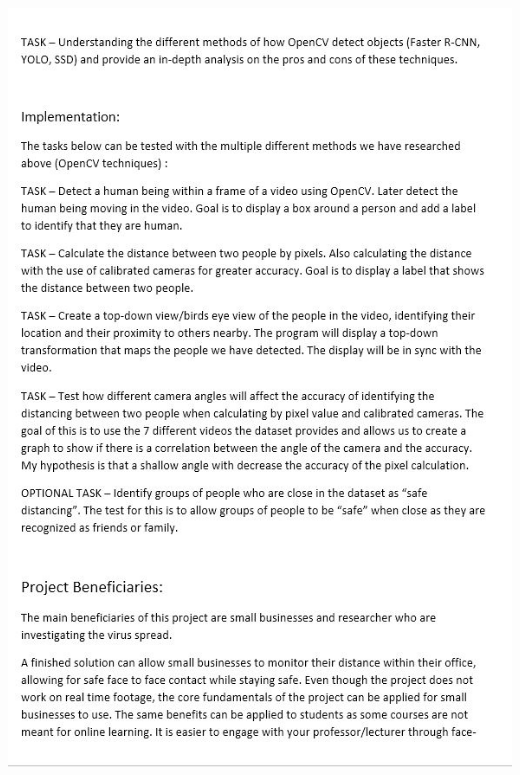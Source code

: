 \documentclass[12pt]{report}
\begin{document}
\includegraphics[width=160mm]{./images/appendix/PDD2.JPG}
\end{document}
